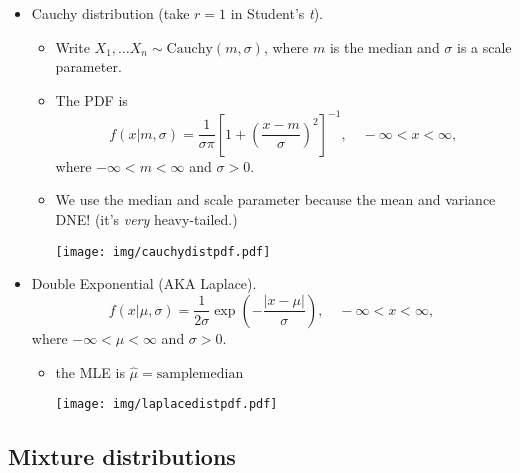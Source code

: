 \documentclass[captions=tableheading]{scrbook}
\begin{document}
\begin{itemize}
\begin{itemize}
\item Cauchy distribution (take $r = 1$ in Student's \emph{t}).
\begin{itemize}
\item Write \(X_{1},\ldots X_{n} \sim \mathrm{Cauchy}(m,\sigma)\), where $m$ is the median and $\sigma$ is a scale parameter.
\item The PDF is 
    \begin{equation}
    f(x|m,\sigma)=\frac{1}{\sigma\pi}\left[1+\left(\frac{x-m}{\sigma}\right)^{2}\right]^{-1},\quad -\infty < x <\infty,
    \end{equation}
    where $-\infty < m < \infty$ and $\sigma > 0$.
\item We use the median and scale parameter because the mean and variance DNE! (it's \emph{very} heavy-tailed.)
    \begin{center}

    \texttt{[image: img/cauchydistpdf.pdf]}

    \end{center}
\end{itemize}
\end{itemize}


\begin{itemize}
\item Double Exponential (AKA Laplace).
    \begin{equation}
    f(x|\mu,\sigma)=\frac{1}{2\sigma}\exp\left(-\frac{|x - \mu|}{\sigma}\right),\quad -\infty < x <\infty,
    \end{equation}
    where $-\infty < \mu < \infty$ and $\sigma > 0$.
\begin{itemize}
\item the MLE is \(\hat{\mu} = \mathrm{sample median}\)
    \begin{center}

    \texttt{[image: img/laplacedistpdf.pdf]}

    \end{center}
\end{itemize}
\end{itemize}

\end{itemize} %
\subsection{Mixture distributions}
\label{sec-1_2_3}
\end{document}
